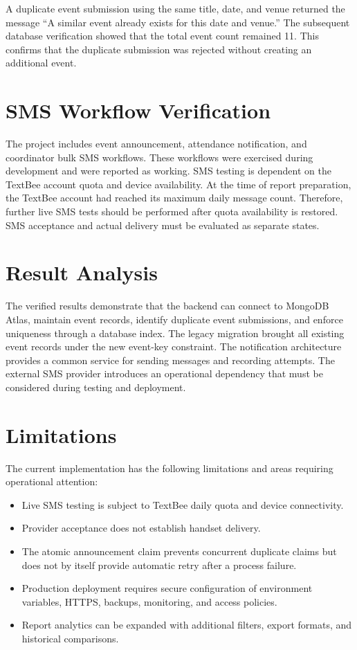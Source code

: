 \documentclass[12pt,a4paper,oneside]{report}
\begin{document}
A duplicate event submission using the same title, date, and venue returned the message ``A similar event already exists for this date and venue.'' The subsequent database verification showed that the total event count remained 11. This confirms that the duplicate submission was rejected without creating an additional event.

\section{SMS Workflow Verification}
The project includes event announcement, attendance notification, and coordinator bulk SMS workflows. These workflows were exercised during development and were reported as working. SMS testing is dependent on the TextBee account quota and device availability. At the time of report preparation, the TextBee account had reached its maximum daily message count. Therefore, further live SMS tests should be performed after quota availability is restored. SMS acceptance and actual delivery must be evaluated as separate states.

\section{Result Analysis}
The verified results demonstrate that the backend can connect to MongoDB Atlas, maintain event records, identify duplicate event submissions, and enforce uniqueness through a database index. The legacy migration brought all existing event records under the new event-key constraint. The notification architecture provides a common service for sending messages and recording attempts. The external SMS provider introduces an operational dependency that must be considered during testing and deployment.

\section{Limitations}
The current implementation has the following limitations and areas requiring operational attention:
\begin{itemize}
  \item Live SMS testing is subject to TextBee daily quota and device connectivity.
  \item Provider acceptance does not establish handset delivery.
  \item The atomic announcement claim prevents concurrent duplicate claims but does not by itself provide automatic retry after a process failure.
  \item Production deployment requires secure configuration of environment variables, HTTPS, backups, monitoring, and access policies.
  \item Report analytics can be expanded with additional filters, export formats, and historical comparisons.
\end{itemize}
\end{document}
